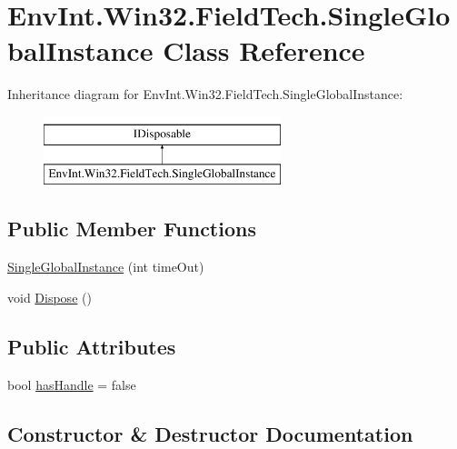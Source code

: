 \hypertarget{class_env_int_1_1_win32_1_1_field_tech_1_1_single_global_instance}{}\section{Env\+Int.\+Win32.\+Field\+Tech.\+Single\+Global\+Instance Class Reference}
\label{class_env_int_1_1_win32_1_1_field_tech_1_1_single_global_instance}
Inheritance diagram for Env\+Int.\+Win32.\+Field\+Tech.\+Single\+Global\+Instance\+:\begin{figure}[H]
\begin{center}
\leavevmode
\includegraphics[height=2.000000cm]{class_env_int_1_1_win32_1_1_field_tech_1_1_single_global_instance}
\end{center}
\end{figure}
\subsection*{Public Member Functions}
\begin{DoxyCompactItemize}
\item 
\hyperlink{class_env_int_1_1_win32_1_1_field_tech_1_1_single_global_instance_a45adbc294f291ced776088868243d5d4}{Single\+Global\+Instance} (int time\+Out)
\item 
void \hyperlink{class_env_int_1_1_win32_1_1_field_tech_1_1_single_global_instance_a0d52402cc2ea5700437b5d65c7c71fbe}{Dispose} ()
\end{DoxyCompactItemize}
\subsection*{Public Attributes}
\begin{DoxyCompactItemize}
\item 
bool \hyperlink{class_env_int_1_1_win32_1_1_field_tech_1_1_single_global_instance_afca77fc8ac39ba502474590299339726}{has\+Handle} = false
\end{DoxyCompactItemize}


\subsection{Constructor \& Destructor Documentation}
\hypertarget{class_env_int_1_1_win32_1_1_field_tech_1_1_single_global_instance_a45adbc294f291ced776088868243d5d4}{}
